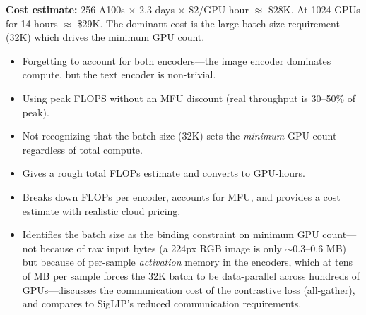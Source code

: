 \begin{interviewq}
\textbf{Cost estimate:} 256 A100s $\times$ 2.3 days $\times$ \$2/GPU-hour $\approx$ \$28K. At 1024 GPUs for 14 hours $\approx$ \$29K. The dominant cost is the large batch size requirement (32K) which drives the minimum GPU count.

\redflags
\begin{itemize}
    \item Forgetting to account for both encoders---the image encoder dominates compute, but the text encoder is non-trivial.
    \item Using peak FLOPS without an MFU discount (real throughput is 30--50\% of peak).
    \item Not recognizing that the batch size (32K) sets the \textit{minimum} GPU count regardless of total compute.
\end{itemize}


\goodgreat
\begin{itemize}
    \item {} Gives a rough total FLOPs estimate and converts to GPU-hours.
    \item {} Breaks down FLOPs per encoder, accounts for MFU, and provides a cost estimate with realistic cloud pricing.
    \item {} Identifies the batch size as the binding constraint on minimum GPU count---not because of raw input bytes (a 224px RGB image is only $\sim$0.3--0.6 MB) but because of per-sample \textit{activation} memory in the encoders, which at tens of MB per sample forces the 32K batch to be data-parallel across hundreds of GPUs---discusses the communication cost of the contrastive loss (all-gather), and compares to SigLIP's reduced communication requirements.
\end{itemize}

\end{interviewq}


